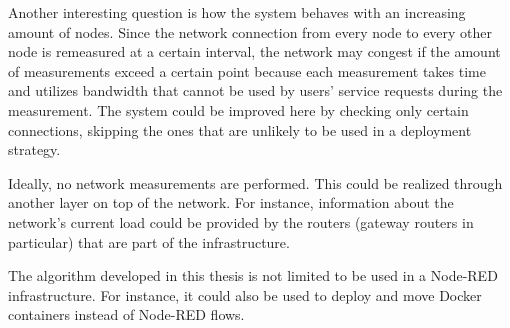 Another interesting question is how the system behaves with an increasing amount of nodes.
Since the network connection from every node to every other node is remeasured at a certain interval, the network may congest if the amount of measurements exceed a certain point because each measurement takes time and utilizes bandwidth that cannot be used by users' service requests during the measurement.
The system could be improved here by checking only certain connections, skipping the ones that are unlikely to be used in a deployment strategy.

Ideally, no network measurements are performed.
This could be realized through another layer on top of the network.
For instance, information about the network's current load could be provided by the routers (gateway routers in particular) that are part of the infrastructure.


The algorithm developed in this thesis is not limited to be used in a Node-RED infrastructure.
For instance, it could also be used to deploy and move Docker containers instead of Node-RED flows.